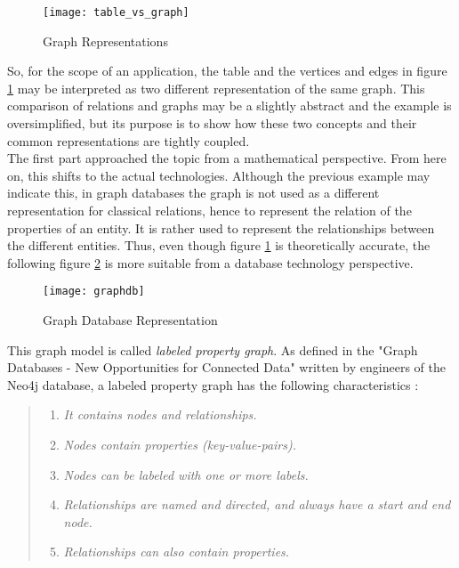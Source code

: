 \begin{figure}[H]
	\centering
	\texttt{[image: table\_vs\_graph]}
	\caption[graph representations]{Graph Representations }
	\label{fig:GraphTheoryExample}
\end{figure}

So, for the scope of an application, the table and the vertices and edges in figure \ref{fig:GraphTheoryExample} may be interpreted as two different representation of the same graph. This comparison of relations and graphs may be a slightly abstract and the example is oversimplified, but its purpose is to show how these two concepts and their common representations are tightly coupled.\\

The first part approached the topic from a mathematical perspective. From here on, this shifts to the actual technologies. Although the previous example may indicate this, in graph databases the graph is not used as a different representation for classical relations, hence to represent the relation of the properties of an entity. It is rather used to represent the relationships between the different entities. Thus, even though figure \ref{fig:GraphTheoryExample} is theoretically accurate, the following figure \ref{fig:GraphDBExample} is more suitable from a database technology perspective.

\begin{figure}[H]
	\centering
	\texttt{[image: graphdb]}
	\caption[Graph Database Representation]{Graph Database Representation }
	\label{fig:GraphDBExample}
\end{figure}

This graph model is called \emph{labeled property graph}. As defined in the "Graph Databases - New Opportunities for Connected Data" written by engineers of the Neo4j database, a labeled property graph has the following characteristics \cite{neo4j}:

\begin{quote}
	\begin{enumerate}
		\item\textit{It contains nodes and relationships. }
		\item\textit{Nodes contain properties (key-value-pairs). }
		\item\textit{Nodes can be labeled with one or more labels. }
		\item\textit{Relationships are named and directed, and always have a start and end node. }
		\item\textit{Relationships can also contain properties. }
	\end{enumerate}
\end{quote}

